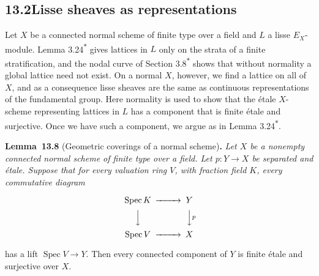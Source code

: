 \documentclass[11pt]{article}
\newenvironment{bpstatement}[2]{\par\addvspace{0.6\baselineskip}\noindent\textbf{#1}#2\textbf{.}\enspace\ignorespaces}
  {\par\addvspace{0.4\baselineskip}}
\newenvironment{bpstatementit}[2]{\begin{bpstatement}{#1}{#2}\itshape\ignorespaces}{\end{bpstatement}}
\newcommand{\bpout}[1]{#1\textsuperscript{\hyperlink{bp-outside}{\ensuremath{\ast}}}}
\begin{document}
\subsection*{\texorpdfstring{13.2\quad Lisse sheaves as representations}{13.2 Lisse sheaves as representations}}
\label{bp26}%
\label{bp27}%
Let \(X\) be a connected normal scheme of finite type over a field and \(L\) a lisse \(E_X\)-module. Lemma \bpout{3.24} gives lattices in \(L\) only on the strata of a finite stratification, and the nodal curve of Section \bpout{3.8} shows that without normality a global lattice need not exist. On a normal \(X\), however, we find a lattice on all of \(X\), and as a consequence lisse sheaves are the same as continuous representations of the fundamental group. Here normality is used to show that the étale \(X\)-scheme representing lattices in \(L\) has a component that is finite étale and surjective. Once we have such a component, we argue as in Lemma \bpout{3.24}.

\label{bp28}%
\begin{bpstatementit}{Lemma~13.8}{ (Geometric coverings of a normal scheme)}
Let \(X\) be a nonempty connected normal scheme of finite type over a field. Let \(p:Y\to X\) be separated and étale. Suppose that for every valuation ring \(V\), with fraction field \(K\), every commutative diagram

\[
\begin{CD}
\operatorname{Spec}K @>>> Y\\
@VVV @VVpV\\
\operatorname{Spec}V @>>> X
\end{CD}
\]

has a lift \(\operatorname{Spec}V\to Y\). Then every connected component of \(Y\) is finite étale and surjective over \(X\).
\end{bpstatementit}
\end{document}
